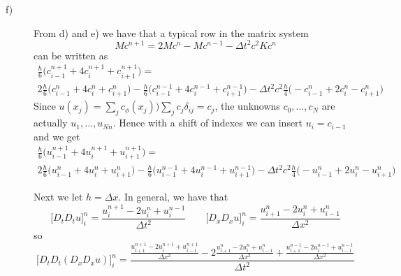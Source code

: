 \documentclass[a4paper,10pt]{article}
\begin{document}
\begin{description}
\item[f)]
From d) and e) we have that a typical row in the matrix system
\[ M c^{n+1} = 2M c^n - M c^{n-1} - \Delta t^2 c^2 K c^n\]
can be written as 
\begin{multline*}
 \frac{h}{6} \Big( c_{i-1}^{n+1} + 4 c_{i}^{n+1} + c_{i+1}^{n+1} \Big) = \\
 2 \frac{h}{6} \Big( c_{i-1}^{n} + 4 c_{i}^{n} + c_{i+1}^{n} \Big) -
 \frac{h}{6} \Big( c_{i-1}^{n-1} + 4 c_{i}^{n-1} + c_{i+1}^{n-1} \Big) - 
 \Delta t^2 c^2 \frac{h}{4} \Big( - c_{i-1}^{n} + 2 c_{i}^{n} - c_{i+1}^{n} \Big)
 \end{multline*}
Since $u(x_j) = \sum_j c_ \phi (x_j) ) \sum_j c_j \delta_{ij} = c_j$, the unknowns $c_0,...,c_N$ are actually $u_1,...,u_{Nn}$.  
Hence with a shift of indexes we can insert $u_i = c_{i-1}$ and we get
\begin{multline*}
 \frac{h}{6} \Big( u_{i-1}^{n+1} + 4 u_{i}^{n+1} + u_{i+1}^{n+1} \Big) = \\
 2 \frac{h}{6} \Big( u_{i-1}^{n} + 4 u_{i}^{n} + u_{i+1}^{n} \Big) -
 \frac{h}{6} \Big( u_{i-1}^{n-1} + 4 u_{i}^{n-1} + u_{i+1}^{n-1} \Big) - 
 \Delta t^2 c^2 \frac{h}{4} \Big( - u_{i-1}^{n} + 2 u_{i}^{n} - u_{i+1}^{n} \Big)
 \end{multline*}
 
Next we let $h = \Delta x$.\newline 
In general, we have that
\[ \lbrack D_t D_t u \rbrack_i^n = \frac{u_i^{n+1} - 2 u_i^n + u_i^{n-1}}{\Delta t^2} \qquad
 \lbrack D_x D_x u \rbrack_i^n = \frac{u_{i+1}^{n} - 2 u_i^n + u_{i-1}^{n}}{\Delta x^2} \]
so
\[ \lbrack D_t D_t (D_x D_x u) \rbrack_i^n = \frac{\frac{u_{i+1}^{n+1} - 2 u_i^{n+1} + u_{i-1}^{n+1}}{\Delta x^2} 
- 2 \frac{u_{i+1}^{n} - 2 u_i^n + u_{i-1}^{n}}{\Delta x^2} + \frac{u_{i+1}^{n-1} - 2 u_i^{n-1} + u_{i-1}^{n-1}}{\Delta x^2} }{\Delta t^2} \]


\end{description}
\end{document}
